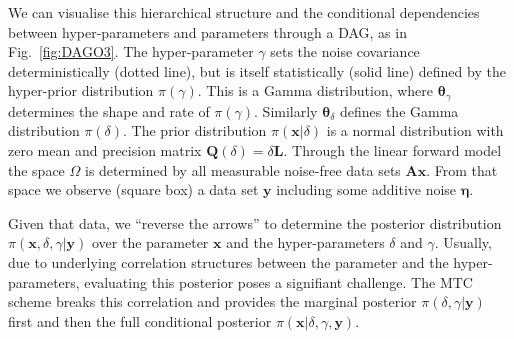 We can visualise this hierarchical structure and the conditional dependencies between hyper-parameters and parameters through a DAG, as in Fig.~\ref{fig:DAGO3}.
The hyper-parameter $\gamma$ sets the noise covariance deterministically (dotted line), but is itself statistically (solid line) defined by the hyper-prior distribution $\pi(\gamma)$.
This is a Gamma distribution, where $\bm{\theta}_{\gamma}$ determines the shape and rate of $\pi(\gamma)$.
Similarly $\bm{\theta}_{\delta}$ defines the Gamma distribution $\pi(\delta)$.
The prior distribution $\pi(\bm{x}|\delta)$ is a normal distribution with zero mean and precision matrix $\bm{Q}(\delta) =\delta \bm{L}$.
Through the linear forward model the space $\Omega$ is determined by all measurable noise-free data sets $\bm{A}\bm{x}$.
From that space we observe (square box) a data set $\bm{y}$ including some additive noise $\bm{\eta}$.

Given that data, we ``reverse the arrows'' to determine the posterior distribution $\pi(\bm{x}, \delta, \gamma |\bm{y})$ over the parameter $\bm{x}$ and the hyper-parameters $\delta$ and $\gamma$.
Usually, due to underlying correlation structures between the parameter and the hyper-parameters, evaluating this posterior poses a signifiant challenge.
The MTC scheme breaks this correlation and provides the marginal posterior $\pi(\delta, \gamma | \bm{y})$ first and then the full conditional posterior $\pi(\bm{x}|\delta, \gamma,\bm{y})$.

